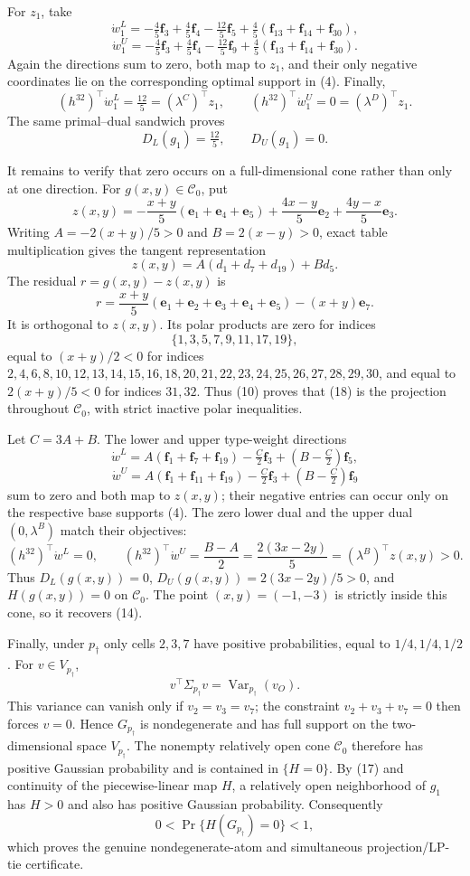 For \(z_1\), take
\[
\dot w^L_1=-\tfrac45\mathbf f_3+\tfrac45\mathbf f_4-\tfrac{12}{5}\mathbf f_5
+\tfrac45(\mathbf f_{13}+\mathbf f_{14}+\mathbf f_{30}),
\]
\[
\dot w^U_1=-\tfrac45\mathbf f_3+\tfrac45\mathbf f_4-\tfrac{12}{5}\mathbf f_9
+\tfrac45(\mathbf f_{13}+\mathbf f_{14}+\mathbf f_{30}).
\tag{15}
\]
Again the directions sum to zero, both map to \(z_1\), and their only negative coordinates lie on the corresponding optimal support in (4).  Finally,
\[
(h^{32})^{\top}\dot w^L_1=\tfrac{12}{5}=(\lambda^C)^{\top}z_1,
\qquad
(h^{32})^{\top}\dot w^U_1=0=(\lambda^D)^{\top}z_1.
\tag{16}
\]
The same primal--dual sandwich proves
\[
D_L(g_1)=\tfrac{12}{5},\qquad D_U(g_1)=0.
\tag{17}
\]

It remains to verify that zero occurs on a full-dimensional cone rather than only at one direction.  For \(g(x,y)\in\mathcal C_0\), put
\[
z(x,y)=-\frac{x+y}{5}(\mathbf e_1+\mathbf e_4+\mathbf e_5)
+\frac{4x-y}{5}\mathbf e_2+\frac{4y-x}{5}\mathbf e_3.
\tag{18}
\]
Writing \(A=-2(x+y)/5>0\) and \(B=2(x-y)>0\), exact table multiplication gives the tangent representation
\[
z(x,y)=A(d_1+d_7+d_{19})+Bd_5.
\tag{19}
\]
The residual \(r=g(x,y)-z(x,y)\) is
\[
r=\frac{x+y}{5}(\mathbf e_1+\mathbf e_2+\mathbf e_3+\mathbf e_4+\mathbf e_5)
-(x+y)\mathbf e_7.
\]
It is orthogonal to \(z(x,y)\).  Its polar products are zero for indices
\[
\{1,3,5,7,9,11,17,19\},
\]
equal to \((x+y)/2<0\) for indices \(2,4,6,8,10,12,13,14,15,16,18,20,21,22,23,24,25,26,27,28,29,30\), and equal to \(2(x+y)/5<0\) for indices \(31,32\).  Thus (10) proves that (18) is the projection throughout \(\mathcal C_0\), with strict inactive polar inequalities.

Let \(C=3A+B\).  The lower and upper type-weight directions
\[
\dot w^L=A(\mathbf f_1+\mathbf f_7+\mathbf f_{19})-\tfrac C2\mathbf f_3
+(B-\tfrac C2)\mathbf f_5,
\]
\[
\dot w^U=A(\mathbf f_1+\mathbf f_{11}+\mathbf f_{19})-\tfrac C2\mathbf f_3
+(B-\tfrac C2)\mathbf f_9
\tag{20}
\]
sum to zero and both map to \(z(x,y)\); their negative entries can occur only on the respective base supports (4).  The zero lower dual and the upper dual \((0,\lambda^B)\) match their objectives:
\[
(h^{32})^{\top}\dot w^L=0,
\qquad
(h^{32})^{\top}\dot w^U=\frac{B-A}{2}
=\frac{2(3x-2y)}5=(\lambda^B)^{\top}z(x,y)>0.
\tag{21}
\]
Thus \(D_L(g(x,y))=0\), \(D_U(g(x,y))=2(3x-2y)/5>0\), and \(H(g(x,y))=0\) on \(\mathcal C_0\).  The point \((x,y)=(-1,-3)\) is strictly inside this cone, so it recovers (14).

Finally, under \(p_\dagger\) only cells \(2,3,7\) have positive probabilities, equal to \(1/4,1/4,1/2\).  For \(v\in V_{p_\dagger}\),
\[
v^{\top}\Sigma_{p_\dagger}v=\operatorname{Var}_{p_\dagger}(v_O).
\]
This variance can vanish only if \(v_2=v_3=v_7\); the constraint \(v_2+v_3+v_7=0\) then forces \(v=0\).  Hence \(G_{p_\dagger}\) is nondegenerate and has full support on the two-dimensional space \(V_{p_\dagger}\).  The nonempty relatively open cone \(\mathcal C_0\) therefore has positive Gaussian probability and is contained in \(\{H=0\}\).  By (17) and continuity of the piecewise-linear map \(H\), a relatively open neighborhood of \(g_1\) has \(H>0\) and also has positive Gaussian probability.  Consequently
\[
0<\Pr\{H(G_{p_\dagger})=0\}<1,
\]
which proves the genuine nondegenerate-atom and simultaneous projection/LP-tie certificate.